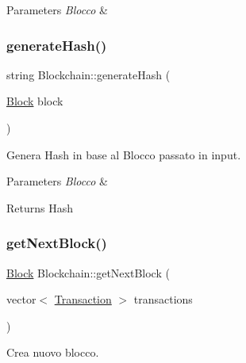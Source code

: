\begin{DoxyParams}{Parameters}
{\em Blocco} & \\
\hline
\end{DoxyParams}
\mbox{\label{class_blockchain_ac205005ce824cb95db61f8e51fa4370d}} 
\subsubsection{\texorpdfstring{generate\+Hash()}{generateHash()}}
{\footnotesize\ttfamily string Blockchain\+::generate\+Hash (\begin{DoxyParamCaption}\item[{\mbox{\hyperlink{class_block}{Block}}}]{block }\end{DoxyParamCaption})\hspace{0.3cm}{\ttfamily [virtual]}}



Genera Hash in base al Blocco passato in input. 


\begin{DoxyParams}{Parameters}
{\em Blocco} & \\
\hline
\end{DoxyParams}
\begin{DoxyReturn}{Returns}
Hash 
\end{DoxyReturn}
\mbox{\label{class_blockchain_ab354aa0a5e51a564c817255b0ddc3419}} 
\subsubsection{\texorpdfstring{get\+Next\+Block()}{getNextBlock()}}
{\footnotesize\ttfamily \mbox{\hyperlink{class_block}{Block}} Blockchain\+::get\+Next\+Block (\begin{DoxyParamCaption}\item[{vector$<$ \mbox{\hyperlink{class_transaction}{Transaction}} $>$}]{transactions }\end{DoxyParamCaption})\hspace{0.3cm}{\ttfamily [virtual]}}



Crea nuovo blocco. 


